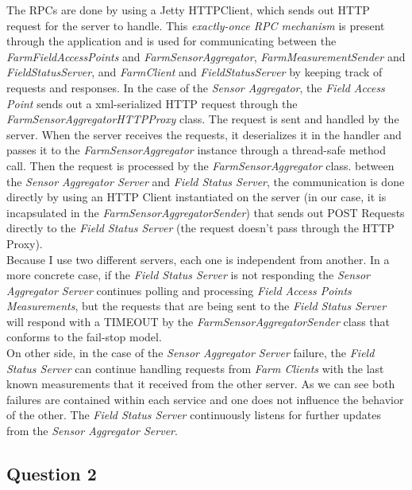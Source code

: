 \documentclass{article}      %
\begin{document}
The RPCs are done by using a Jetty HTTPClient, which sends out HTTP request for the server to handle. This \emph{exactly-once RPC mechanism} is present through the application and is used for communicating between the \emph{FarmFieldAccessPoints} and \emph{FarmSensorAggregator}, \emph{FarmMeasurementSender} and \emph{FieldStatusServer}, and \emph{FarmClient} and \emph{FieldStatusServer} by keeping track of requests and responses. In the case of the \emph{Sensor Aggregator}, the \emph{Field Access Point} sends out a xml-serialized HTTP request through the \emph{FarmSensorAggregatorHTTPProxy} class. The request is sent and handled by the server. When the server receives the requests, it deserializes it in the handler and passes it to the \emph{FarmSensorAggregator} instance through a thread-safe method call. Then the request is processed by the \emph{FarmSensorAggregator} class. between the \emph{Sensor Aggregator Server} and \emph{Field Status Server}, the communication is done directly by using an HTTP Client instantiated on the server (in our case, it is incapsulated in the \emph{FarmSensorAggregatorSender}) that sends out POST Requests directly to the \emph{Field Status Server} (the request doesn't pass through the HTTP Proxy).\\

Because I use two different servers, each one is independent from another. In a more concrete case, if the \emph{Field Status Server} is not responding the \emph{Sensor Aggregator Server} continues polling and processing \emph{Field Access Points Measurements}, but the requests that are being sent to the \emph{Field Status Server} will respond with a TIMEOUT by the \emph{FarmSensorAggregatorSender} class that conforms to the fail-stop model.\\

On other side, in the case of the \emph{Sensor Aggregator Server} failure, the \emph{Field Status Server} can continue handling requests from \emph{Farm Clients} with the last known measurements that it received from the other server. As we can see both failures are contained within each service and one does not influence the behavior of the other. The \emph{Field Status Server} continuously listens for further updates from the \emph{Sensor Aggregator Server}.\\

\subsection* {Question 2}
\end{document}
